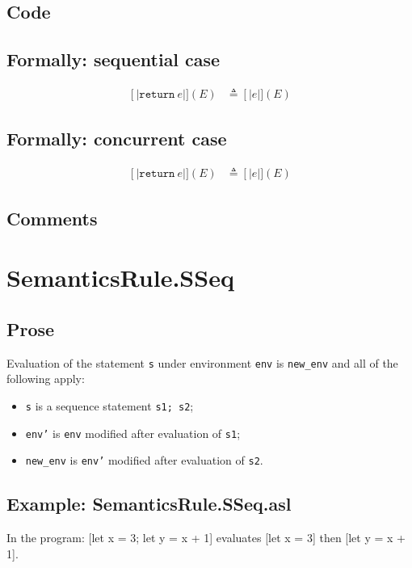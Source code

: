 \documentclass{book}
\newcommand\syntt[1]{\mathtt{#1}}
\newcommand\llbracket{[|}
\newcommand\rrbracket{|]}
\newcommand\interp[1]{\left\llbracket #1 \right\rrbracket}
\begin{document}
  \subsection{Code}

  \subsection{Formally: sequential case}
  \begin{align}
  \interp{\syntt{return}\ e} (E) & \triangleq \interp{e} (E)
  \label{eq:sem-seq-sreturn}
  \end{align} 

  \subsection{Formally: concurrent case}
  \begin{align}
  \interp{\syntt{return}\ e} (E) & \triangleq \interp{e} (E)
  \label{eq:sem-conc-sreturn}
  \end{align} 

    \subsection{Comments}

\section{SemanticsRule.SSeq \label{sec:SemanticsRule.SSeq}}

  \subsection{Prose}
  Evaluation of the statement \texttt{s} under environment \texttt{env} is
\texttt{new\_env} and all of the following apply:
  \begin{itemize}
  \item \texttt{s} is a sequence statement \texttt{s1; s2};
  \item \texttt{env'} is \texttt{env} modified after evaluation of \texttt{s1};
  \item \texttt{new\_env} is \texttt{env'} modified after evaluation of \texttt{s2}.
  \end{itemize}

  \subsection{Example: SemanticsRule.SSeq.asl}
  In the program:
  [let x = 3; let y = x + 1] evaluates [let x = 3] then [let y = x + 1].
\end{document}
